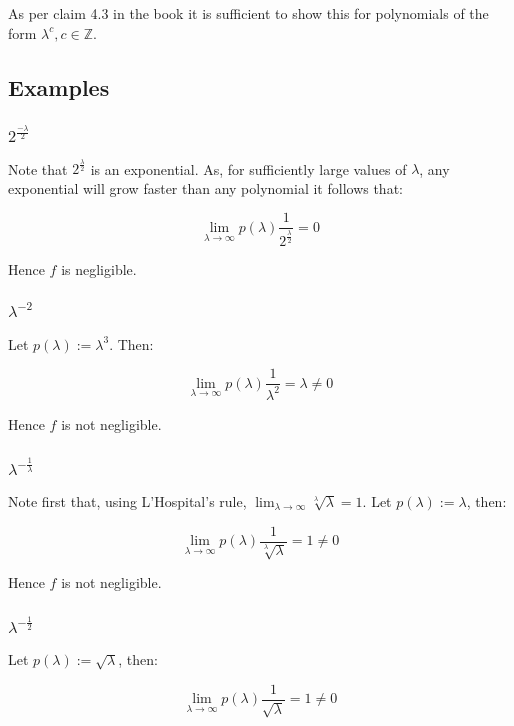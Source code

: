 \documentclass[a4paper]{scrreprt}
\begin{document}
As per claim 4.3 in the book it is sufficient to show this for polynomials of
the form $\lambda^c, c \in \mathbb{Z}$.

\subsection{Examples}

\subsubsection{$2^{\frac{-\lambda}{2}}$}

Note that $2^{\frac{\lambda}{2}}$ is an exponential. As, for sufficiently large
values of $\lambda$, any exponential will grow faster than any polynomial it
follows that:

\[
	\lim_{\lambda \rightarrow \infty} p(\lambda) \frac{1}{2^{\frac{\lambda}{2}}} = 0
\]

Hence $f$ is negligible.

\subsubsection{$\lambda^{-2}$}

Let $p(\lambda) := \lambda^3$. Then:

\[
	\lim_{\lambda \rightarrow \infty} p(\lambda) \frac{1}{\lambda^2} = \lambda \neq 0
\]

Hence $f$ is not negligible.

\subsubsection{$\lambda^{-\frac{1}{\lambda}}$}

Note first that, using L'Hospital's rule, $\lim_{\lambda \rightarrow \infty}
\sqrt[\lambda]{\lambda} = 1$. Let $p(\lambda) := \lambda$, then:

\[
	\lim_{\lambda \rightarrow \infty} p(\lambda) \frac{1}{\sqrt[\lambda]{\lambda}} = 1 \neq 0
\]

Hence $f$ is not negligible.

\subsubsection{$\lambda^{-\frac{1}{2}}$}

Let $p(\lambda) := \sqrt{\lambda}$, then:

\[
	\lim_{\lambda \rightarrow \infty} p(\lambda) \frac{1}{\sqrt{\lambda}} = 1 \neq 0
\]
\end{document}

